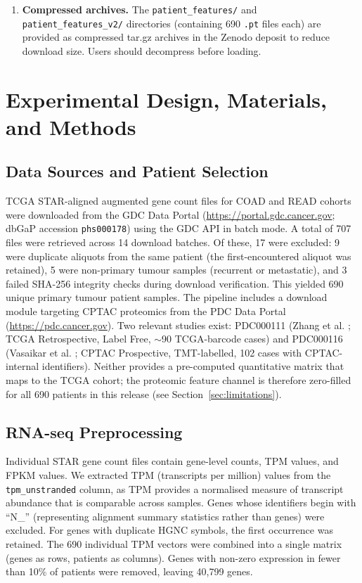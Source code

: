 \documentclass[12pt,a4paper]{article}
\begin{document}
\begin{enumerate}
\item \textbf{Compressed archives.} The \texttt{patient\_features/} and \texttt{patient\_features\_v2/} directories (containing 690 \texttt{.pt} files each) are provided as compressed tar.gz archives in the Zenodo deposit to reduce download size. Users should decompress before loading.
\end{enumerate}

\section{Experimental Design, Materials, and Methods}

\subsection{Data Sources and Patient Selection}

TCGA STAR-aligned augmented gene count files for COAD and READ cohorts were downloaded from the GDC Data Portal (\url{https://portal.gdc.cancer.gov}; dbGaP accession \texttt{phs000178}) using the GDC API in batch mode. A total of 707 files were retrieved across 14 download batches. Of these, 17 were excluded: 9 were duplicate aliquots from the same patient (the first-encountered aliquot was retained), 5 were non-primary tumour samples (recurrent or metastatic), and 3 failed SHA-256 integrity checks during download verification. This yielded 690 unique primary tumour patient samples. The pipeline includes a download module targeting CPTAC proteomics from the PDC Data Portal (\url{https://pdc.cancer.gov}). Two relevant studies exist: PDC000111 (Zhang et al. \cite{Zhang2014}; TCGA Retrospective, Label Free, $\sim$90 TCGA-barcode cases) and PDC000116 (Vasaikar et al. \cite{Vasaikar2019}; CPTAC Prospective, TMT-labelled, 102 cases with CPTAC-internal identifiers). Neither provides a pre-computed quantitative matrix that maps to the TCGA cohort; the proteomic feature channel is therefore zero-filled for all 690 patients in this release (see Section~\ref{sec:limitations}).

\subsection{RNA-seq Preprocessing}

Individual STAR gene count files contain gene-level counts, TPM values, and FPKM values. We extracted TPM (transcripts per million) values from the \texttt{tpm\_unstranded} column, as TPM provides a normalised measure of transcript abundance that is comparable across samples. Genes whose identifiers begin with ``N\_'' (representing alignment summary statistics rather than genes) were excluded. For genes with duplicate HGNC symbols, the first occurrence was retained. The 690 individual TPM vectors were combined into a single matrix (genes as rows, patients as columns). Genes with non-zero expression in fewer than 10\% of patients were removed, leaving 40,799 genes.
\end{document}
